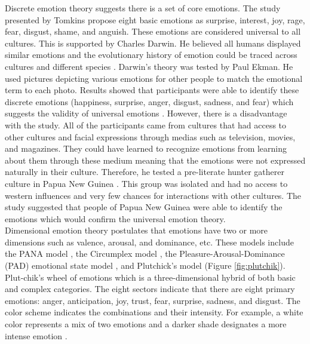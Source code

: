 Discrete emotion theory suggests there is a set of core emotions. The study presented by Tomkins \cite{emotions3-tomkins1962affect} propose eight basic emotions as surprise, interest, joy, rage, fear, disgust, shame, and anguish. These emotions are considered universal to all cultures. This is supported by Charles Darwin. He believed all humans displayed similar emotions and the evolutionary history of emotion could be traced across cultures and different species \cite{emotions4-darwin1998expression}. Darwin's theory was tested by Paul Ekman. He used pictures depicting various emotions for other people to match the emotional term to each photo. Results showed that participants were able to identify these discrete emotions (happiness, surprise, anger, disgust, sadness, and fear) which suggests the validity of universal emotions \cite{emotions5-ekman1999basic}. However, there is a disadvantage with the study. All of the participants came from cultures that had access to other cultures and facial expressions through medias such as television, movies, and magazines. They could have learned to recognize emotions from learning about them through these medium meaning that the emotions were not expressed naturally in their culture. Therefore, he tested a pre-literate hunter gatherer culture in Papua New Guinea \cite{emotions6-ekman1993facial}. This group was isolated and had no access to western influences and very few chances for interactions with other cultures. The study suggested that people of Papua New Guinea were able to identify the emotions which would confirm the universal emotion theory. \\

Dimensional emotion theory postulates that emotions have two or more dimensions such as valence, arousal, and dominance, etc. These models include the PANA model \cite{emotions7-watson1985toward}, the Circumplex model \cite{emotions8-russell1980circumplex}, the Pleasure-Arousal-Dominance (PAD) emotional state model \cite{emotions9-mehrabian1995framework}, and Plutchick’s model \cite{plutchik_model} (Figure \ref{fig:plutchik}). Plut-chik's wheel of emotions which is a three-dimensional hybrid of both basic and complex categories. The eight sectors indicate that there are eight primary emotions: anger, anticipation, joy, trust, fear, surprise, sadness, and disgust. The color scheme indicates the combinations and their intensity. For example, a white color represents a mix of two emotions and a darker shade designates a more intense emotion \cite{HP_RPP}.

